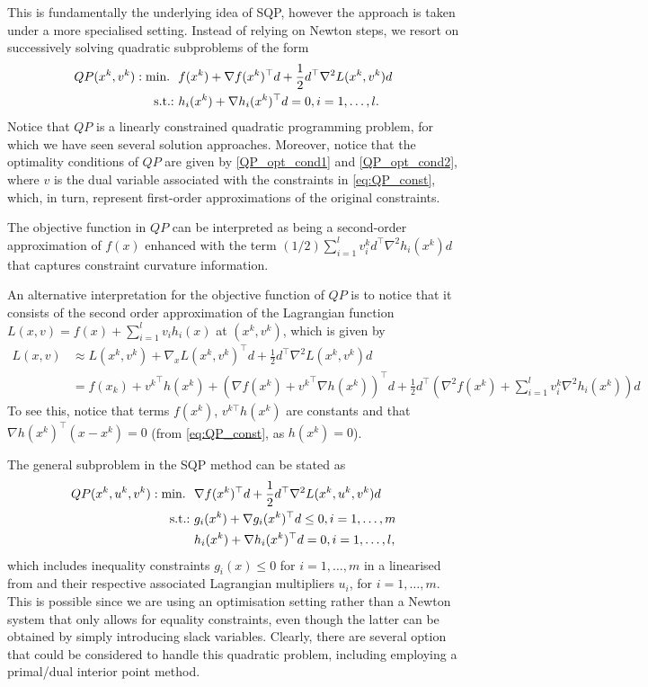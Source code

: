 This is fundamentally the underlying idea of SQP, however the approach is taken under a more specialised setting. Instead of relying on Newton steps, we resort on successively solving quadratic subproblems of the form
%
\begin{align}
QP(x^k, v^k) : \mathop{\text{min.~}} \ & f(x^k)+ \nabla f(x^k)^\top d + \frac{1}{2}d^\top\nabla^2L(x^k,v^k)d \label{eq:QP_objfun}\\
\mathop{\text{s.t.:~}} & h_i(x^k) + \nabla h_i(x^k)^\top d = 0, i = 1,\dots,l. \label{eq:QP_const}
\end{align}
%
Notice that $QP$ is a linearly constrained quadratic programming problem, for which we have seen several solution approaches. Moreover, notice that the optimality conditions of $QP$ are given by \eqref{QP_opt_cond1} and \eqref{QP_opt_cond2}, where $v$ is the dual variable associated with the constraints in \eqref{eq:QP_const}, which, in turn, represent first-order approximations of the original constraints. 

The objective function in $QP$ can be interpreted as being a second-order approximation of $f(x)$ enhanced with the term $(1/2)\sum_{i=1}^lv^k_id^\top\nabla^2 h_i(x^k)d$ that captures constraint curvature information. 

An alternative interpretation for the objective function of $QP$ is to notice that it consists of the second order approximation of the Lagrangian function $L(x,v) = f(x) + \sum_{i=1}^lv_ih_i(x)$ at $(x^k, v^k)$, which is given by 
%
\begin{align*}
	L(x,v) &\approx L(x^k,v^k) + \nabla_{x}L(x^k, v^k)^\top d + \frac{1}{2}d^\top \nabla^2L(x^k,v^k)d \\	
		   &= f(x_k) + {v^k}^\top h(x^k) + (\nabla f(x^k) + {v^k}^\top \nabla h(x^k))^\top d + \frac{1}{2}d^\top (\nabla^2f(x^k) + \sum_{i=1}^lv^k_i\nabla^2h_i(x^k))d 
\end{align*}
% 
To see this, notice that terms $f(x^k)$, $v^{k\top}h(x^k)$ are constants and that $\nabla h(x^k)^\top (x - x^k) = 0$ (from \eqref{eq:QP_const}, as $h(x^k) = 0$). 

The general subproblem in the SQP method can be stated as 
%
\begin{align*}
QP(x^k, u^k, v^k) : \mathop{\text{min.~}} \ & \nabla f(x^k)^\top d + \frac{1}{2}d^\top\nabla^2L(x^k,u^k,v^k)d \\
\mathop{\text{s.t.:~}} & g_i(x^k) + \nabla g_i(x^k)^\top d \leq 0, i = 1,\dots,m \\ 
& h_i(x^k) + \nabla h_i(x^k)^\top d = 0, i = 1,\dots,l,
\end{align*}
which includes inequality constraints $g_i(x) \leq 0 $ for $i=1,\dots,m$ in a linearised from and their respective associated Lagrangian multipliers $u_i$, for $i=1,\dots,m$. This is possible since we are using an optimisation setting rather than a Newton system that only allows for equality constraints, even though the latter can be obtained by simply introducing slack variables. Clearly, there are several option that could be considered to handle this quadratic problem, including employing a primal/dual interior point method.

